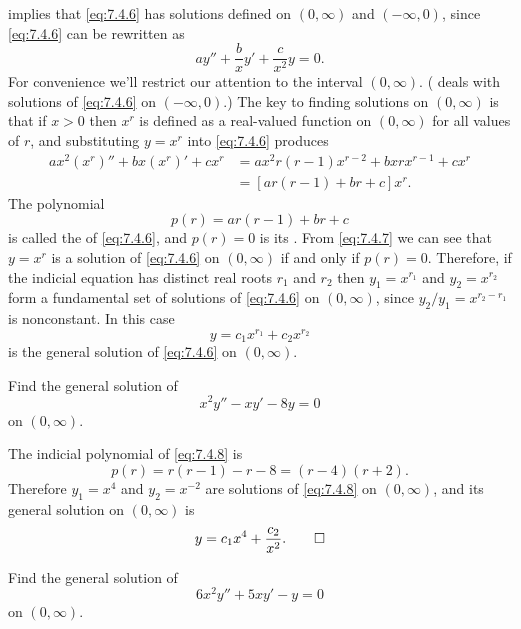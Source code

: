  implies that \eqref{eq:7.4.6} has
solutions defined on $(0,\infty)$ and $(-\infty,0)$,
since \eqref{eq:7.4.6} can be rewritten as
\[
ay''+\frac{b}{x}y'+\frac{c}{x^2}y=0.
\]
For convenience we'll restrict our attention to the interval
$(0,\infty)$. ( deals with solutions of
\eqref{eq:7.4.6} on $(-\infty,0)$.) The key to finding solutions on
$(0,\infty)$ is  that if $x>0$ then $x^r$ is defined as a
real-valued function on $(0,\infty)$ for all values of $r$, and
substituting $y=x^r$ into \eqref{eq:7.4.6} produces
\begin{equation}\label{eq:7.4.7}
\begin{aligned}
ax^2(x^r)''+bx(x^r)'+cx^r&=ax^2r(r-1)x^{r-2}+bx rx^{r-1}+cx^r\\
&=[ar(r-1)+br+c]x^r.
\end{aligned}
\end{equation}
The polynomial
\[
p(r)=ar(r-1)+br+c
\]
is called the  of \eqref{eq:7.4.6}, and
$p(r)=0$
is its . From \eqref{eq:7.4.7} we can
see that
$y=x^r$ is a solution of \eqref{eq:7.4.6} on $(0,\infty)$ if and only if
$p(r)=0$. Therefore, if the indicial equation has distinct real roots
$r_1$ and $r_2$ then $y_1=x^{r_1}$ and $y_2=x^{r_2}$ form a
fundamental set of solutions of \eqref{eq:7.4.6} on
$(0,\infty)$, since $y_2/y_1=x^{r_2-r_1}$ is nonconstant.
In this case
\[
y=c_1x^{r_1}+c_2x^{r_2}
\]
is the general solution of \eqref{eq:7.4.6} on $(0,\infty)$.

\begin{example}\label{example:7.4.4}
 Find the general solution of
\begin{equation} \label{eq:7.4.8}
x^2y''-xy'-8y=0
\end{equation}
on  $(0,\infty)$.
\end{example}

\begin{solution}
 The indicial polynomial of \eqref{eq:7.4.8} is
\[
p(r)=r(r-1)-r-8=(r-4)(r+2).
\]
Therefore $y_1=x^4$ and $y_2=x^{-2}$ are solutions of \eqref{eq:7.4.8} on
$(0,\infty)$, and its general solution on $(0,\infty)$ is
\[
y=c_1x^4+\frac{c_2}{x^2}.\qedhere
\]
\end{solution}

\begin{example}\label{example:7.4.5}
  Find the general solution of
\begin{equation} \label{eq:7.4.9}
6x^2y''+5xy'-y=0
\end{equation}
on  $(0,\infty)$.
\end{example}

